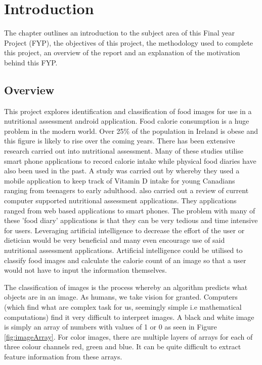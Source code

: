 \chapter{Introduction}
\label{intro}
The chapter outlines an introduction to the subject area of this Final year Project (FYP), the objectives of this project, the methodology used to complete this project, an overview of the report and an explanation of the motivation behind this FYP.

\section{Overview}
This project explores identification and classification of food images for use in a nutritional assessment android application.
Food calorie consumption is a huge problem in the modern world.
Over 25\% of the population in Ireland is obese and this figure is likely to rise over the coming years.
There has been extensive research carried out into nutritional assessment.
Many of these studies utilise smart phone applications to record calorie intake while physical food diaries have also been used in the past.
A study was carried out by \textcite{goodman2015vitamin} whereby they used a mobile application to keep track of Vitamin D intake for young Canadians ranging from teenagers to early adulthood.
\textcite{arens2015promising} also carried out a review of current computer supported nutritional assessment applications. They applications ranged from web based applications to smart phones.
The problem with many of these 'food diary' applications is that they can be very tedious and time intensive for users.
Leveraging artificial intelligence to decrease the effort of the user or dietician would be very beneficial and many even encourage use of said nutritional assessment applications.
Artificial intelligence could be utilised to classify food images and calculate the calorie count of an image so that a user would not have to input the information themselves.

The classification of images is the process whereby an algorithm predicts what objects are in an image.
As humans, we take vision for granted.
Computers (which find what are complex task for us, seemingly simple i.e mathematical computations) find it very difficult to interpret images.
A black and white image is simply an array of numbers with values of 1 or 0 as seen in Figure \ref{fig:imageArray}. 
For color images, there are multiple layers of arrays for each of three colour channels red, green and blue.
It can be quite difficult to extract feature information from these arrays.

